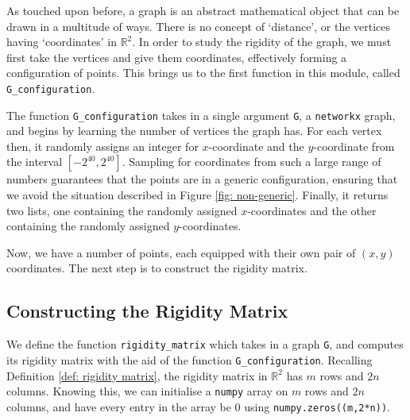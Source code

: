 \begin{flushleft}
As touched upon before, a graph is an abstract mathematical object that can be drawn in a multitude of ways. There is no concept of `distance', or the vertices having `coordinates' in $\mathbb{R}^2$. In order to study the rigidity of the graph, we must first take the vertices and give them coordinates, effectively forming a configuration of points. This brings us to the first function in this module, called \texttt{G\_configuration}.
\end{flushleft}

\begin{flushleft}
The function \texttt{G\_configuration} takes in a single argument \texttt{G}, a \texttt{networkx} graph, and begins by learning the number of vertices the graph has. For each vertex then, it randomly assigns an integer for $x$-coordinate and the $y$-coordinate from the interval $[-2^{40}, 2^{40}]$. 
Sampling for coordinates from such a large range of numbers guarantees that the points are in a generic configuration, ensuring that we avoid the situation described in Figure \ref{fig: non-generic}. Finally, it returns two lists, one containing the randomly assigned $x$-coordinates and the other containing the randomly assigned $y$-coordinates.
\end{flushleft}

\begin{flushleft}
Now, we have a number of points, each equipped with their own pair of $(x,y)$ coordinates. The next step is to construct the rigidity matrix.
\end{flushleft}

\subsection{Constructing the Rigidity Matrix}

\begin{flushleft}
We define the function \texttt{rigidity\_matrix} which takes in a graph \texttt{G}, and computes its rigidity matrix with the aid of the function \texttt{G\_configuration}. Recalling Definition \ref{def: rigidity matrix}, the rigidity matrix in $\mathbb{R}^2$ has $m$ rows and $2n$ columns. Knowing this, we can initialise a \texttt{numpy} array on $m$ rows and $2n$ columns, and have every entry in the array be 0 using \texttt{numpy.zeros((m,2*n))}. 
\end{flushleft}

